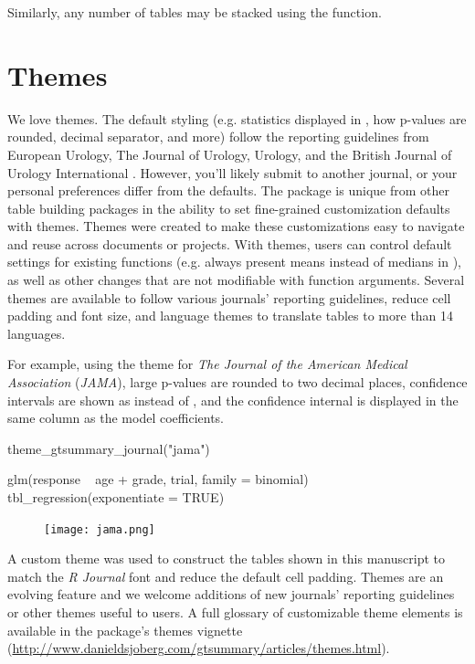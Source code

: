 Similarly, any number of  tables may be stacked using the  function.

\section{Themes}

We love themes.
The default styling (e.g. statistics displayed in , how p-values are rounded, decimal separator, and more) follow the reporting guidelines from European Urology, The Journal of Urology, Urology, and the British Journal of Urology International \citep{assel2019guidelines}.
However, you'll likely submit to another journal, or your personal preferences differ from the defaults.
The  package is unique from other table building packages in the ability to set fine-grained customization defaults with themes. 
Themes were created to make these customizations easy to navigate and reuse across documents or projects. 
With themes, users can control default settings for existing functions (e.g. always present means instead of medians in ), as well as other changes that are not modifiable with function arguments.
Several themes are available to follow various journals' reporting guidelines, reduce cell padding and font size, and language themes to translate  tables to more than 14 languages.

For example, using the theme for \textit{The Journal of the American Medical Association} (\textit{JAMA}), large p-values are rounded to two decimal places, confidence intervals are shown as  instead of , and the confidence internal is displayed in the same column as the model coefficients. 

\begin{example}
theme_gtsummary_journal("jama")

glm(response ~ age + grade, trial, family = binomial) %
  tbl_regression(exponentiate = TRUE)
\end{example}

\begin{figure}[h!]
  \texttt{[image: jama.png]}
  \centering
\end{figure}

A custom theme was used to construct the  tables shown in this manuscript to match the \emph{R Journal} font and reduce the default cell padding. 
Themes are an evolving feature and we welcome additions of new journals' reporting guidelines or other themes useful to users.
A full glossary of customizable theme elements is available in the package's themes vignette (\url{http://www.danieldsjoberg.com/gtsummary/articles/themes.html}).

